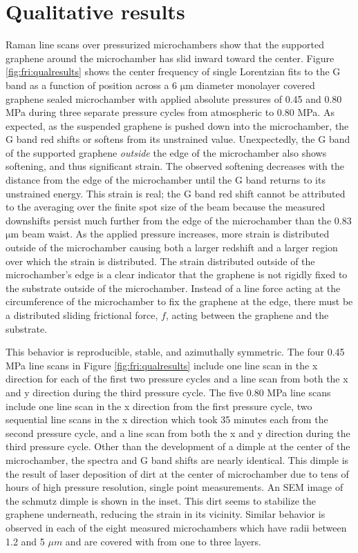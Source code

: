 \section{Qualitative results}
Raman line scans over pressurized microchambers show that the supported graphene around the microchamber has slid inward toward the center.
Figure \ref{fig:fri:qualresults} shows the center frequency of single Lorentzian fits to the G band as a function of position across a 6 $\mathrm{\mu}$m diameter monolayer covered graphene sealed microchamber with applied absolute pressures of 0.45 and 0.80 MPa during three separate pressure cycles from atmospheric to 0.80 MPa.
As expected, as the suspended graphene is pushed down into the microchamber, the G band red shifts or softens from its unstrained value.
Unexpectedly, the G band of the supported graphene \emph{outside} the edge of the microchamber also shows softening, and thus significant strain.
The observed softening decreases with the distance from the edge of the microchamber until the G band returns to its unstrained energy.
This strain is real; the G band red shift cannot be attributed to the averaging over the finite spot size of the beam because the measured downshifts persist much further from the edge of the microchamber than the 0.83 $\mathrm{\mu}$m beam waist.
As the applied pressure increases, more strain is distributed outside of the microchamber causing both a larger redshift and a larger region over which the strain is distributed.
The strain distributed outside of the microchamber's edge is a clear indicator that the graphene is not rigidly fixed to the substrate outside of the microchamber.
Instead of a line force acting at the circumference of the microchamber to fix the graphene at the edge, there must be a distributed sliding frictional force, $f$, acting between the graphene and the substrate.

This behavior is reproducible, stable, and azimuthally symmetric.
The four 0.45 MPa line scans in Figure \ref{fig:fri:qualresults} include one line scan in the x direction for each of the first two pressure cycles and a line scan from both the x and y direction during the third pressure cycle.
The five 0.80 MPa line scans include one line scan in the x direction from the first pressure cycle, two sequential line scans in the x direction which took 35 minutes each from the second pressure cycle, and a line scan from both the x and y direction during the third pressure cycle.
Other than the development of a dimple at the center of the microchamber, the spectra and G band shifts are nearly identical.
This dimple is the result of laser deposition of dirt at the center of microchamber due to tens of hours of high pressure resolution, single point measurements.
An SEM image of the schmutz dimple is shown in the inset.
This dirt seems to stabilize the graphene underneath, reducing the strain in its vicinity.
Similar behavior is observed in each of the eight measured microchambers which have radii between 1.2 and 5 $\mu m$ and are covered with from one to three layers.


